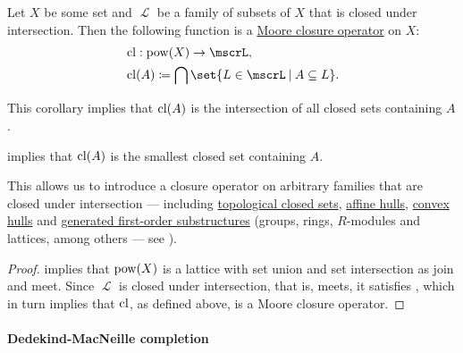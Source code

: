 \begin{corollary}\label{thm:closure_operator_from_set_semilattice}
  Let \( X \) be some set and \( \mscrL \) be a family of subsets of \( X \) that is closed under intersection. Then the following function is a \hyperref[def:moore_closure_operator]{Moore closure operator} on \( X \):
  \begin{equation*}
    \begin{aligned}
      &\cl: \pow(X) \to \mscrL, \\
      &\cl(A) \coloneqq \bigcap \set{ L \in \mscrL \given A \subseteq L }. \\
    \end{aligned}
  \end{equation*}
\end{corollary}
\begin{comments}
  \item This corollary implies that \( \operatorname{cl}(A) \) is the intersection of all closed sets containing \( A \).
  \item {} implies that \( \operatorname{cl}(A) \) is the smallest closed set containing \( A \).
\end{comments}
\begin{comments}
  \item This allows us to introduce a closure operator on arbitrary families that are closed under intersection --- including \hyperref[def:topological_space]{topological closed sets}, \hyperref[def:affine_hull]{affine hulls}, \hyperref[def:convex_hull]{convex hulls} and \hyperref[def:first_order_generated_substructure]{generated first-order substructures} (groups, rings, \( R \)-modules and lattices, among others --- see ).
\end{comments}
\begin{proof}
   implies that \( \operatorname{pow}(X) \) is a lattice with set union and set intersection as join and meet. Since \( \mscrL \) is closed under intersection, that is, meets, it satisfies , which in turn implies that \( \operatorname{cl} \), as defined above, is a Moore closure operator.
\end{proof}

\paragraph{Dedekind-MacNeille completion}


